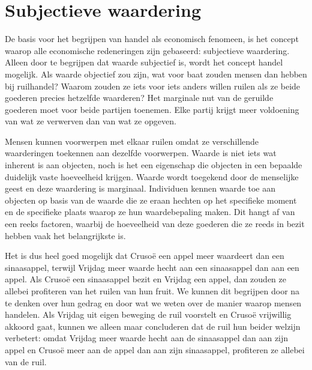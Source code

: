\documentclass[
  a5paper,
  smalldemyvopaper,11pt,twoside,onecolumn,openright,extrafontsizes,
hidelinks]{memoir}
\begin{document}
\section{Subjectieve waardering}\label{subjectieve-waardering}

De basis voor het begrijpen van handel als economisch fenomeen, is het
concept waarop alle economische redeneringen zijn gebaseerd: subjectieve
waardering. Alleen door te begrijpen dat waarde subjectief is, wordt het
concept handel mogelijk. Als waarde objectief zou zijn, wat voor baat
zouden mensen dan hebben bij ruilhandel? Waarom zouden ze iets voor iets
anders willen ruilen als ze beide goederen precies hetzelfde waarderen?
Het marginale nut van de geruilde goederen moet voor beide partijen
toenemen. Elke partij krijgt meer voldoening van wat ze verwerven dan
van wat ze opgeven.

Mensen kunnen voorwerpen met elkaar ruilen omdat ze verschillende
waarderingen toekennen aan dezelfde voorwerpen. Waarde is niet iets wat
inherent is aan objecten, noch is het een eigenschap die objecten in een
bepaalde duidelijk vaste hoeveelheid krijgen. Waarde wordt toegekend
door de menselijke geest en deze waardering is marginaal. Individuen
kennen waarde toe aan objecten op basis van de waarde die ze eraan
hechten op het specifieke moment en de specifieke plaats waarop ze hun
waardebepaling maken. Dit hangt af van een reeks factoren, waarbij de
hoeveelheid van deze goederen die ze reeds in bezit hebben vaak het
belangrijkste is.

Het is dus heel goed mogelijk dat Crusoë een appel meer waardeert dan
een sinaasappel, terwijl Vrijdag meer waarde hecht aan een sinaasappel
dan aan een appel. Als Crusoë een sinaasappel bezit en Vrijdag een
appel, dan zouden ze allebei profiteren van het ruilen van hun fruit. We
kunnen dit begrijpen door na te denken over hun gedrag en door wat we
weten over de manier waarop mensen handelen. Als Vrijdag uit eigen
beweging de ruil voorstelt en Crusoë vrijwillig akkoord gaat, kunnen we
alleen maar concluderen dat de ruil hun beider welzijn verbetert: omdat
Vrijdag meer waarde hecht aan de sinaasappel dan aan zijn appel en
Crusoë meer aan de appel dan aan zijn sinaasappel, profiteren ze allebei
van de ruil.
\end{document}
